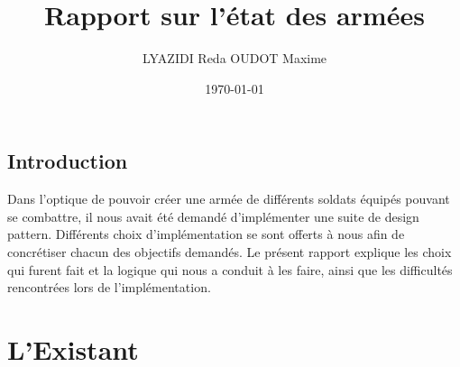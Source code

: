 ﻿\documentclass[12pt]{article}
\title{Rapport sur l'état des armées}
\author{LYAZIDI Reda  \hspace*{1cm} OUDOT Maxime}
\date{\today}
\begin{document}
\maketitle
\tableofcontents

\newpage
\vspace*{8cm}
\begin{center} \section*{Introduction} \end{center}

Dans l'optique de pouvoir créer une armée de différents soldats équipés pouvant se combattre, il nous avait été demandé d'implémenter une suite de design pattern.
Différents choix d'implémentation se sont offerts à nous afin de concrétiser chacun des objectifs demandés.
Le présent rapport explique les choix qui furent fait et la logique qui nous a conduit à les faire, ainsi que les difficultés rencontrées lors de l'implémentation.

\newpage
\section{L'Existant}
\end{document}

